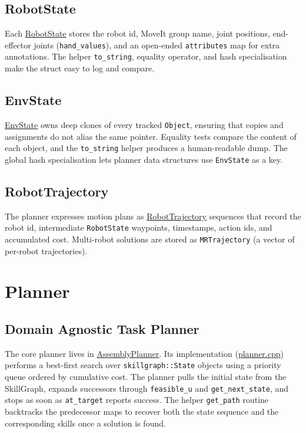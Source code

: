 \documentclass{article}
\begin{document}
\subsection{RobotState}
Each \href{https://github.com/intelligent-control-lab/AIDF/blob/main/skillgraph/api/data_structure.hpp#L6}{RobotState} stores the robot id, MoveIt group name, joint positions, end-effector joints (\texttt{hand_values}), and an open-ended \texttt{attributes} map for extra annotations. The helper \texttt{to_string}, equality operator, and hash specialisation make the struct easy to log and compare.

\subsection{EnvState}
\href{https://github.com/intelligent-control-lab/AIDF/blob/main/skillgraph/api/data_structure.hpp#L45}{EnvState} owns deep clones of every tracked \texttt{Object}, ensuring that copies and assignments do not alias the same pointer. Equality tests compare the content of each object, and the \texttt{to_string} helper produces a human-readable dump. The global hash specialisation lets planner data structures use \texttt{EnvState} as a key.

\subsection{RobotTrajectory}
The planner expresses motion plans as \href{https://github.com/intelligent-control-lab/AIDF/blob/main/skillgraph/api/data_structure.hpp#L134}{RobotTrajectory} sequences that record the robot id, intermediate \texttt{RobotState} waypoints, timestamps, action ids, and accumulated cost. Multi-robot solutions are stored as \texttt{MRTrajectory} (a vector of per-robot trajectories).


\section{Planner}
\subsection{Domain Agnostic Task Planner}
The core planner lives in \href{https://github.com/intelligent-control-lab/AIDF/blob/main/planner/include/planner.h#L13}{AssemblyPlanner}. Its implementation (\href{https://github.com/intelligent-control-lab/AIDF/blob/main/planner/src/planner.cpp#L12}{planner.cpp}) performs a best-first search over \texttt{skillgraph::State} objects using a priority queue ordered by cumulative cost. The planner pulls the initial state from the SkillGraph, expands successors through \texttt{feasible_u} and \texttt{get_next_state}, and stops as soon as \texttt{at_target} reports success. The helper \texttt{get_path} routine backtracks the predecessor maps to recover both the state sequence and the corresponding skills once a solution is found.
\end{document}
